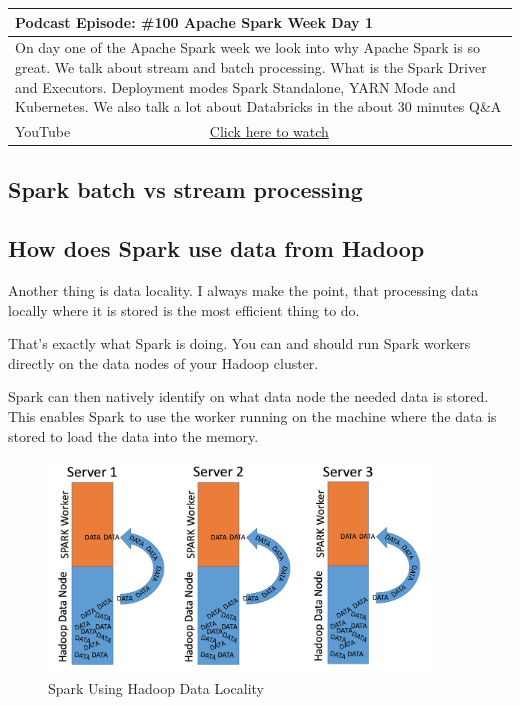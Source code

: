 \documentclass[12pt, numbers=noenddot]{scrreprt} %
\begin{document}
\begin{table}[h]
\begin{tabular}{ll}
\hline
\multicolumn{2}{l}{\textbf{Podcast Episode:} \#100 Apache Spark Week Day 1} \\ \hline
\multicolumn{2}{p{15cm}}{On day one of the Apache Spark week we look into why Apache Spark is so great. We talk about stream and batch processing. What is the Spark Driver and Executors. Deployment modes Spark Standalone, YARN Mode and Kubernetes. We also talk a lot about Databricks in the about 30 minutes Q\&A}         \\ \hline
\multicolumn{1}{l|}{YouTube}   & \href{https://youtu.be/qD6Wi2pfCx0}{Click here to watch}   \\ \hline
\end{tabular}
\end{table}

\subsection{Spark batch vs stream processing}
\subsection{How does Spark use data from Hadoop}
Another thing is data locality. I always make the point, that processing data locally where it is stored is the most efficient thing to do.

That’s exactly what Spark is doing. You can and should run Spark workers directly on the data nodes of your Hadoop cluster.

Spark can then natively identify on what data node the needed data is stored. This enables Spark to use the worker running on the machine where the data is stored to load the data into the memory.

\begin{figure}[htbp]
  \centering
     \includegraphics[width=0.9\textwidth]{images/Spark-Data-Locality.png}
  \caption{Spark Using Hadoop Data Locality}
  \label{fig:Bild1}
\end{figure}
\end{document}
